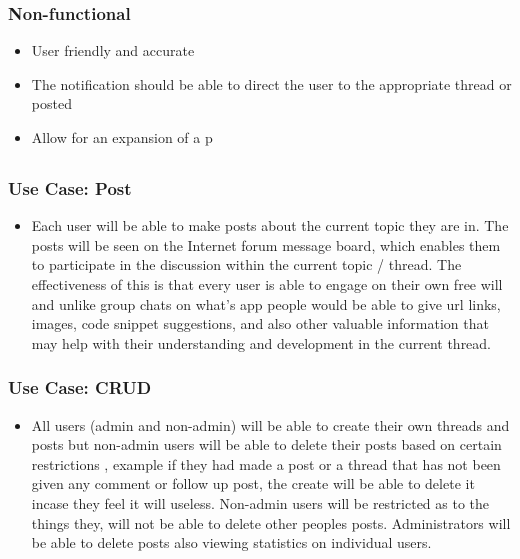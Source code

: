 \documentclass[12pt]{article}
\begin{document}
\subsubsection*{Non-functional}
\begin{itemize}
\item User friendly and accurate
\item The notification should be able to direct the user to the appropriate thread or posted
\item Allow for an expansion of a p
\end{itemize}
\subsection*{}

\subsubsection{Use Case: Post}

\begin{itemize}
\item Each user will be able to make posts about the current topic they are in. The posts will be seen on the Internet forum message board, which enables them to participate in the discussion within the current topic / thread. The effectiveness of this is that every user is able to engage on their own free will and unlike group chats on what’s app people would be able to give url links, images, code snippet suggestions, and also other valuable information that may help with their understanding and development in the current thread.
\end{itemize}

\subsubsection{Use Case: CRUD}

\begin{itemize}
\item All users (admin and non-admin) will be able to create their own threads and posts but non-admin users will be able to delete their posts based on certain restrictions , example if they had made a post or a thread that has not been given any comment or follow up post, the create will be able to delete it incase they feel it will useless.
Non-admin users will be restricted as to the things they, will not be able to delete other peoples posts. Administrators will be able to delete posts also viewing statistics on individual users.
\end{itemize}
\end{document}
